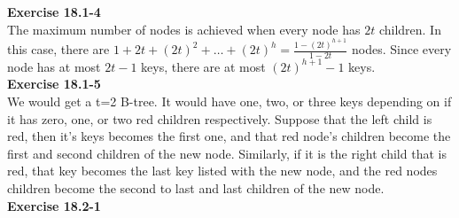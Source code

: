 \documentclass{article}
\begin{document}

\noindent\textbf{Exercise 18.1-4}\\

The maximum number of nodes is achieved when every node has $2t$ children.  In this case, there are $1 + 2t + (2t)^2 + \ldots + (2t)^h = \frac{1-(2t)^{h+1}}{1-2t}$ nodes.  Since every node has at most $2t-1$ keys, there are at most $(2t)^{h+1} - 1$ keys. \\

\noindent\textbf{Exercise 18.1-5}\\

We would get a t=2 B-tree. It would have one, two, or three keys depending on if it has zero, one, or two red children respectively. Suppose that the left child is red, then it's keys becomes the first one, and that red node's children become the first and second children of the new node. Similarly, if it is the right child that is red, that key becomes the last key listed with the new node, and the red nodes children become the second to last and last children of the new node.\\

\noindent\textbf{Exercise 18.2-1}\\%




\end{document}
